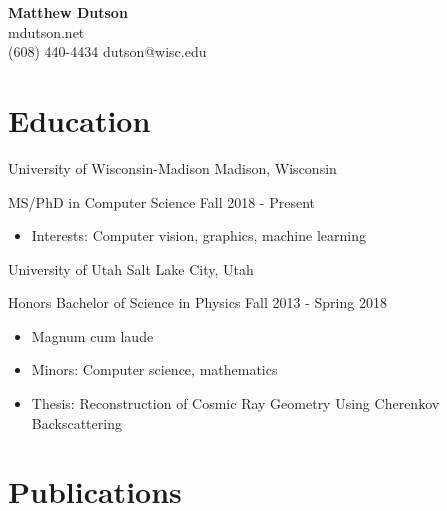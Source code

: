 

\usepackage{bibentry}





\setfont
\pagestyle{empty}

\begin{center}
    {\LARGE \bfseries Matthew Dutson} \\
    \medskip
    mdutson.net \\
    (608) 440-4434 \enspace dutson@wisc.edu
\end{center}

\section*{Education}

\begin{tab1} University of Wisconsin-Madison \> Madison, Wisconsin \end{tab1}

\begin{tab2} MS/PhD in Computer Science \> Fall 2018 - Present \end{tab2}
\begin{itemize}
    \item Interests: Computer vision, graphics, machine learning
\end{itemize}

\blockskip

\begin{tab1} University of Utah \> Salt Lake City, Utah \end{tab1}

\begin{tab2} Honors Bachelor of Science in Physics \> Fall 2013 - Spring 2018 \end{tab2}
\begin{itemize}
    \item Magnum cum laude
    \item Minors: Computer science, mathematics
    \item Thesis: Reconstruction of Cosmic Ray Geometry Using Cherenkov Backscattering
\end{itemize}

\section*{Publications}


